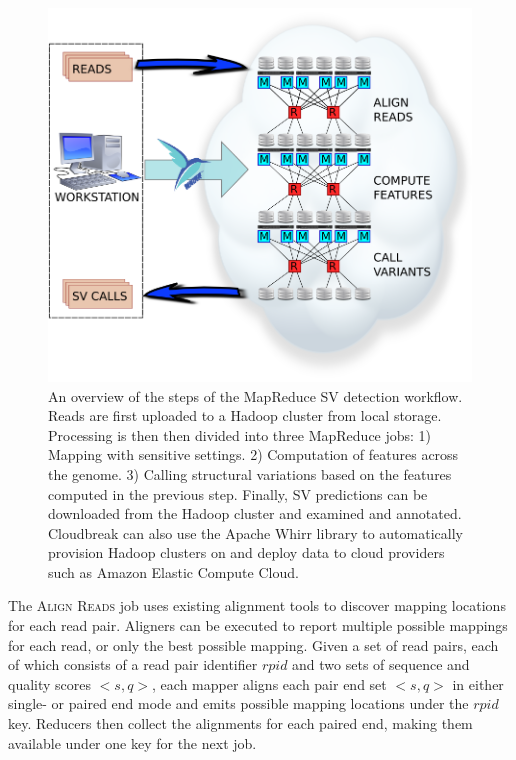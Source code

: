 \begin{figure}
\centering
\includegraphics[width=.8\textwidth]{figures/workflow_with_whirr.png}
\caption{An overview of the steps of the MapReduce SV detection workflow. Reads are first uploaded to a Hadoop cluster from local storage. Processing is then then divided into three MapReduce jobs: 1) Mapping with sensitive settings. 2) Computation of features across the genome. 3) Calling structural variations based on the features computed in the previous step. Finally, SV predictions can be downloaded from the Hadoop cluster and examined and annotated. Cloudbreak can also use the Apache Whirr library to automatically provision Hadoop clusters on and deploy data to cloud providers such as Amazon Elastic Compute Cloud.}
\label{cloudbreak_workflow}
\end{figure}


The \textsc{Align Reads} job uses existing alignment tools to discover mapping locations for each read pair. Aligners can be executed to report multiple possible mappings for each read, or only the best possible mapping. Given a set of read pairs, each of which consists of a read pair identifier $rpid$ and two sets of sequence and quality scores $<s,q>$, each mapper aligns each pair end set $<s,q>$ in either single- or paired end mode and emits possible mapping locations under the $rpid$ key. Reducers then collect the alignments for each paired end, making them available under one key for the next job. 

